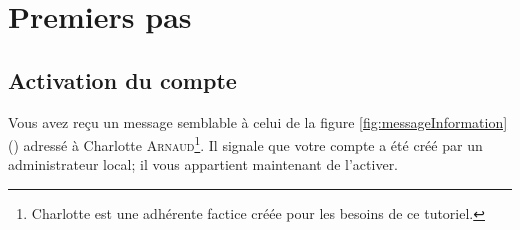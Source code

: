 \chapter{Premiers pas}\label{chap:premiersPas}



\section{Activation du compte}

Vous avez reçu un message semblable à celui de la figure \ref{fig:messageInformation} () adressé à Charlotte \textsc{Arnaud}\footnote{Charlotte est une adhérente factice créée pour les besoins de ce tutoriel.}.
Il signale que votre compte a été créé par un administrateur local; il vous appartient maintenant de l’activer.

